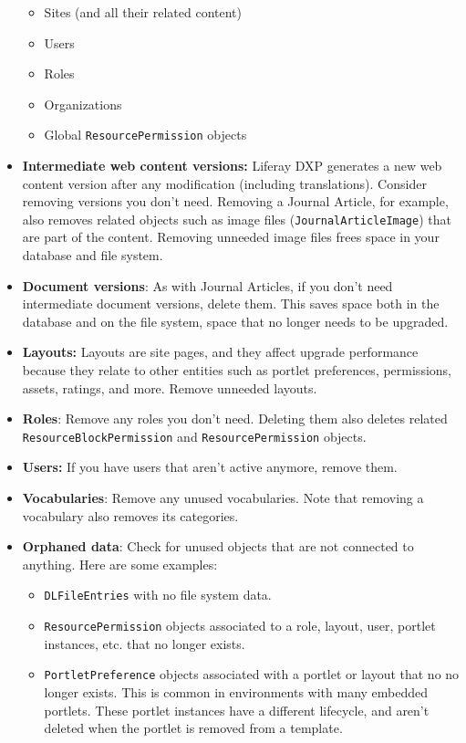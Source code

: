 \begin{itemize}
  \begin{itemize}
  \item
    Sites (and all their related content)
  \item
    Users
  \item
    Roles
  \item
    Organizations
  \item
    Global \texttt{ResourcePermission} objects
  \end{itemize}
\item
  \textbf{Intermediate web content versions:} Liferay DXP generates a
  new web content version after any modification (including
  translations). Consider removing versions you don't need. Removing a
  Journal Article, for example, also removes related objects such as
  image files (\texttt{JournalArticleImage}) that are part of the
  content. Removing unneeded image files frees space in your database
  and file system.
\item
  \textbf{Document versions}: As with Journal Articles, if you don't
  need intermediate document versions, delete them. This saves space
  both in the database and on the file system, space that no longer
  needs to be upgraded.
\item
  \textbf{Layouts:} Layouts are site pages, and they affect upgrade
  performance because they relate to other entities such as portlet
  preferences, permissions, assets, ratings, and more. Remove unneeded
  layouts.
\item
  \textbf{Roles}: Remove any roles you don't need. Deleting them also
  deletes related \texttt{ResourceBlockPermission} and
  \texttt{ResourcePermission} objects.
\item
  \textbf{Users:} If you have users that aren't active anymore, remove
  them.
\item
  \textbf{Vocabularies}: Remove any unused vocabularies. Note that
  removing a vocabulary also removes its categories.
\item
  \textbf{Orphaned data}: Check for unused objects that are not
  connected to anything. Here are some examples:

  \begin{itemize}
  \item
    \texttt{DLFileEntries} with no file system data.
  \item
    \texttt{ResourcePermission} objects associated to a role, layout,
    user, portlet instances, etc. that no longer exists.
  \item
    \texttt{PortletPreference} objects associated with a portlet or
    layout that no no longer exists. This is common in environments with
    many embedded portlets. These portlet instances have a different
    lifecycle, and aren't deleted when the portlet is removed from a
    template.
  \end{itemize}
\end{itemize}

